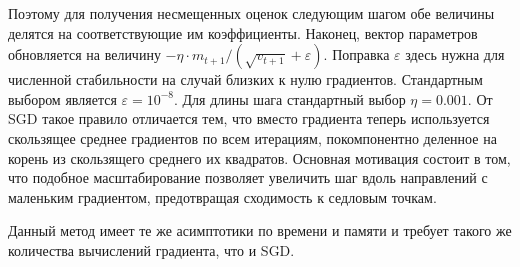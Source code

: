 \documentclass[preprint,12pt]{elsarticle}
\begin{document}
Поэтому для получения несмещенных оценок следующим шагом обе величины делятся на соответствующие им коэффициенты. 
Наконец, вектор параметров обновляется на величину $-\eta \cdot m_{t+1} / (\sqrt{v_{t+1}} + \varepsilon)$. 
Поправка $\varepsilon$ здесь нужна для численной стабильности на случай близких к нулю градиентов. 
Стандартным выбором является $\varepsilon = 10^{-8}$. 
Для длины шага стандартный выбор $\eta = 0.001$. 
От SGD такое правило отличается тем, что вместо градиента теперь используется скользящее среднее градиентов по всем итерациям, покомпонентно деленное на корень из скользящего среднего их квадратов. 
Основная мотивация состоит в том, что подобное масштабирование позволяет увеличить шаг вдоль направлений с маленьким градиентом, предотвращая сходимость к седловым точкам.

Данный метод имеет те же асимптотики по времени и памяти и требует такого же количества вычислений градиента, что и SGD.
\end{document}
